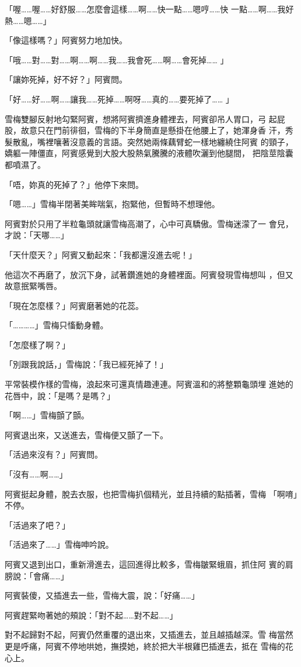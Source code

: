 「喔……喔……好舒服……怎麼會這樣……啊……快一點……嗯哼……快
一點……啊……我好熱……嗯……」

「像這樣嗎？」阿賓努力地加快。

「哦……對……對……啊……啊……我……我會死……啊……會死掉……
」

「讓妳死掉，好不好？」阿賓問。

「好……好……啊……讓我……死掉……啊呀……真的……要死掉了……
」

雪梅雙腳反射地勾緊阿賓，想將阿賓擠進身體裡去，阿賓卻吊人胃口，弓
起屁股，故意只在門前徘徊，雪梅的下半身簡直是懸掛在他腰上了，她渾身香
汗，秀髮散亂，嘴裡嚷著沒意義的言語。突然她兩條藕臂蛇一樣地纏繞住阿賓
的頸子，嬌軀一陣僵直，阿賓感覺到大股大股熱氣騰騰的液體吹灑到他腿間，
把陰莖陰囊都噴濕了。

「唔，妳真的死掉了？」他停下來問。

「嗯……」雪梅半閉著美眸喘氣，抱緊他，但暫時不想理他。

阿賓對於只用了半粒龜頭就讓雪梅高潮了，心中可真驕傲。雪梅迷濛了一
會兒，才說：「天哪……」

「天什麼天？」阿賓又動起來：「我都還沒進去呢！」

他這次不再磨了，放沉下身，試著鑽進她的身體裡面。阿賓發現雪梅想叫
，但又故意抿緊嘴唇。

「現在怎麼樣？」阿賓磨著她的花蕊。

「…………」雪梅只慉動身體。

「怎麼樣了啊？」

「別跟我說話，」雪梅說：「我已經死掉了！」

平常裝模作樣的雪梅，浪起來可還真情趣連連。阿賓溫和的將整顆龜頭埋
進她的花唇中，說：「是嗎？是嗎？」

「啊……」雪梅顫了顫。

阿賓退出來，又送進去，雪梅便又顫了一下。

「活過來沒有？」阿賓問。

「沒有……啊……」

阿賓挺起身體，脫去衣服，也把雪梅扒個精光，並且持續的點插著，雪梅
「啊唷」不停。

「活過來了吧？」

「活過來了……」雪梅呻吟說。

阿賓又退到出口，重新滑進去，這回進得比較多，雪梅皺緊蛾眉，抓住阿
賓的肩膀說：「會痛……」

阿賓裝傻，又插進去一些，雪梅大震，說：「好痛……」

阿賓趕緊吻著她的頰說：「對不起……對不起……」

對不起歸對不起，阿賓仍然重覆的退出來，又插進去，並且越插越深。雪
梅當然更是呼痛，阿賓不停地哄她，撫摸她，終於把大半根雞巴插進去，抵在
雪梅的花心上。

